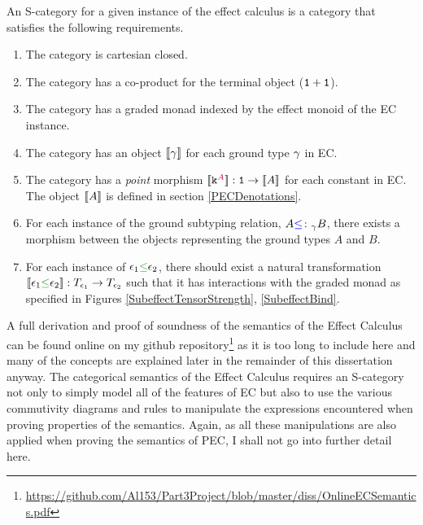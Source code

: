 \documentclass{Report}
\begin{document}
\begin{framed}
    \begin{definition}\label{SCategoryDefinition}   
        An S-category for a given instance of the effect calculus is a category that satisfies the following requirements.
        \begin{enumerate}[label=\roman*.]
            \item The category is cartesian closed.
            \item The category has a co-product for the terminal object ($\texttt{1} + \texttt{1}$).
            \item The category has a graded monad indexed by the effect monoid of the EC instance.
            \item The category has an object ${\bf [\![}\gamma{\bf ]\!]}$ for each ground type $\gamma$ in EC.
            \item The category has a \textit{point} morphism ${\bf [\![}\texttt{k}^{\color{purple} A}{\bf ]\!]}: \texttt{1}\rightarrow {\bf [\![}A{\bf ]\!]}$ for each constant in EC. The object ${\bf [\![}A{\bf ]\!]}$ is defined in section \ref{PECDenotations}.
            \item For each instance of the ground subtyping relation, $A {\color{blue} \leq\colon}_\gamma B$, there exists a morphism between the objects representing the ground types $A$ and $B$.
            \item For each instance of $\e_1 \subeffect \e_2$, there should exist a natural transformation $\db{\e_1\subeffect\e_2}: \T{\e_1}{}\rightarrow\T{\e_2}{}$ such that it has interactions with the graded monad as specified in Figures \ref{SubeffectTensorStrength}, \ref{SubeffectBind}.
        \end{enumerate}
    \end{definition}
\end{framed}

A full derivation and proof of soundness of the semantics of the Effect Calculus can be found online on my github repository\footnote{\url{https://github.com/Al153/Part3Project/blob/master/diss/OnlineECSemantics.pdf}} as it is too long to include here and many of the concepts are explained later in the remainder of this dissertation anyway. The categorical semantics of the Effect Calculus requires an S-category not only to simply model all of the features of EC but also to use the various commutivity diagrams and rules to manipulate the expressions encountered when proving properties of the semantics. Again, as all these manipulations are also applied when proving the semantics of PEC, I shall not go into further detail here.
\end{document}
